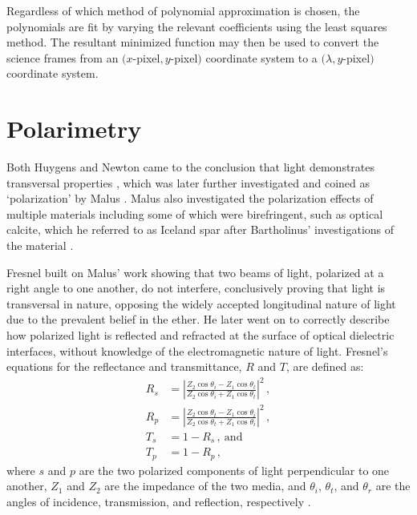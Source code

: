 Regardless of which method of polynomial approximation is chosen, the polynomials are fit by varying the relevant coefficients using the least squares method.
The resultant minimized function may then be used to convert the science frames from an $(x$-pixel$, y$-pixel$)$ coordinate system to a $(\lambda, y$-pixel$)$ coordinate system.


\section{Polarimetry} \label{sec:polarimetry}

Both Huygens and Newton came to the conclusion that light demonstrates transversal properties \citep{Huygens, opticks}, which was later further investigated and coined as `polarization' by Malus \citep{Pol_Malus}.
Malus also investigated the polarization effects of multiple materials including some of which were birefringent, such as optical calcite, which he referred to as Iceland spar after Bartholinus' investigations of the material \citep{Bartholinus}.


Fresnel built on Malus' work showing that two beams of light, polarized at a right angle to one another, do not interfere, conclusively proving that light is transversal in nature, opposing the widely accepted longitudinal nature of light due to the prevalent belief in the ether.
He later went on to correctly describe how polarized light is reflected and refracted at the surface of optical dielectric interfaces, without knowledge of the electromagnetic nature of light.
Fresnel's equations for the reflectance and transmittance, $R$ and $T$, are defined as:
\begin{equation} \label{eq:Fresnel}
    \begin{aligned}
        R_{s} &= \left\lvert \frac{Z_{2} \cos{\theta_{i}} - Z_{1} \cos{\theta_{t}}}{Z_{2} \cos{\theta_{i}} + Z_{1} \cos{\theta_{t}}} \right\rvert^{2}\,,\\
        R_{p} &= \left\lvert \frac{Z_{2} \cos{\theta_{t}} - Z_{1} \cos{\theta_{i}}}{Z_{2} \cos{\theta_{t}} + Z_{1} \cos{\theta_{i}}} \right\rvert^{2}\,,\\
        T_{s} &= 1 - R_{s}\,,\ \text{and}\\
        T_{p} &= 1 - R_{p}\,,
    \end{aligned}
\end{equation}
where $s$ and $p$ are the two polarized components of light perpendicular to one another, $Z_{1}$ and $Z_{2}$ are the impedance of the two media, and $\theta_{i}$, $\theta_{t}$, and $\theta_{r}$ are the angles of incidence, transmission, and reflection, respectively \citep{Fresnel}.

